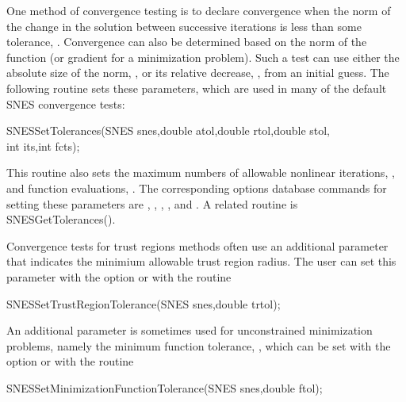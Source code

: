One method of convergence testing is
to declare convergence when the norm of the change in the solution
between successive iterations is less than some tolerance, .
Convergence can also be determined based on the norm of the function
(or gradient for a minimization problem).  
Such a test can use either the absolute size of the
norm, , or its relative decrease, , from an initial
guess.  The following routine sets these parameters, which are used
in many of the default SNES convergence tests: 
\begin{tabbing}
  SNESSetTolerances(SNES snes,double atol,double rtol,double stol,\\
          int its,int fcts);
\end{tabbing}
This routine also sets the maximum numbers of allowable
nonlinear iterations, , and function evaluations, .
The corresponding options database commands for setting these parameters
are , , ,
   
 
, and .
A related routine is SNESGetTolerances(). 

Convergence tests for trust regions methods often use an additional
parameter that indicates the minimium allowable trust region radius.
The user can set this parameter with the option 
 or with the routine
\begin{tabbing}
  SNESSetTrustRegionTolerance(SNES snes,double trtol);
\end{tabbing}
An additional parameter is sometimes used for unconstrained minimization
problems, namely the minimum function tolerance, , which can
be set with the option   or
with the routine
\begin{tabbing}
  SNESSetMinimizationFunctionTolerance(SNES snes,double ftol);
\end{tabbing}

